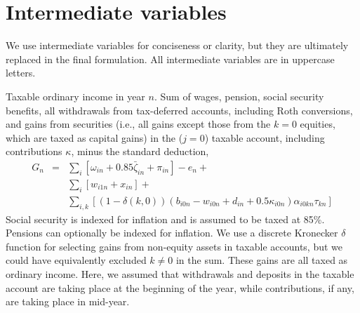 \documentclass{report}[fleqn,11pt]
\begin{document}
\section{Intermediate variables}
We use intermediate variables for conciseness or clarity,
but they are ultimately replaced in the final formulation.
All intermediate variables are in uppercase letters.
\begin{description}[leftmargin=4em,style=multiline]
\item [$G_n$]
	Taxable ordinary income in year $n$. Sum of wages, pension, social security benefits, all withdrawals
	from tax-deferred accounts, including Roth conversions, and gains from securities
	(i.e., all gains except those from the $k=0$ equities, which are taxed as capital gains)
	in the ($j=0$) taxable account, including contributions $\kappa$, minus the standard deduction,
	\begin{eqnarray}
		\label{Eq:Tx2}
		G_n &=& 
		\sum_i [\omega_{in} + 0.85\bar\zeta_{in} + \pi_{in}]
		- e_n +
		\nonumber \\
		&& \sum_i [w_{i1n} + x_{in}] +
		\nonumber \\
		&& \sum_{i,k} 
		[(1-\delta(k, 0))(b_{i0n} - w_{i0n} + d_{in} + 0.5\kappa_{i0n})\alpha_{i0kn}\tau_{kn}]
	\end{eqnarray}
	Social security is indexed for inflation and is assumed to be taxed at 85\%.
	Pensions can optionally be indexed for inflation.
	We use a discrete Kronecker $\delta$ function for selecting gains from non-equity assets in
	taxable accounts, but we could have equivalently excluded $k \neq 0$ in the sum.
	These gains are all taxed as ordinary income. Here, we assumed that
	withdrawals and deposits in the taxable account are taking place at the beginning of the year, while
	contributions, if any, are taking place in mid-year.


\end{description}
\end{document}

